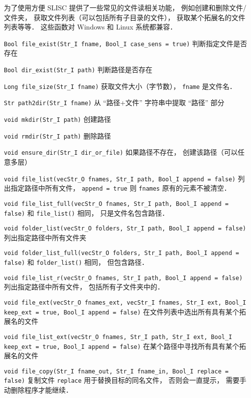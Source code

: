 
\begin{issues}
\issueDraft
\end{issues}

为了使用方便 SLISC 提供了一些常见的文件读相关功能， 例如创建和删除文件/文件夹， 获取文件列表（可以包括所有子目录的文件）， 获取某个拓展名的文件列表等等． 这些函数对 Windows 和 Linux 系统都兼容．

\verb|Bool file_exist(Str_I fname, Bool_I case_sens = true)| 判断指定文件是否存在

\verb|Bool dir_exist(Str_I path)| 判断路径是否存在

\verb|Long file_size(Str_I fname)| 获取文件大小（字节数）， \verb|fname| 是文件名．

\verb|Str path2dir(Str_I fname)| 从 “路径+文件” 字符串中提取 “路径” 部分

\verb|void mkdir(Str_I path)| 创建路径

\verb|void rmdir(Str_I path)| 删除路径

\verb|void ensure_dir(Str_I dir_or_file)| 如果路径不存在， 创建该路径（可以任意多层）

\verb|void file_list(vecStr_O fnames, Str_I path, Bool_I append = false)| 列出指定路径中所有文件， \verb|append = true| 则 \verb|fnames| 原有的元素不被清空．

\verb|void file_list_full(vecStr_O fnames, Str_I path, Bool_I append = false)| 和 \verb|file_list()| 相同， 只是文件名包含路径．

\verb|void folder_list(vecStr_O folders, Str_I path, Bool_I append = false)| 列出指定路径中所有文件夹

\verb|void folder_list_full(vecStr_O folders, Str_I path, Bool_I append = false)| 和 \verb|folder_list()| 相同， 但包含路径．

\verb|void file_list_r(vecStr_O fnames, Str_I path, Bool_I append = false)| 列出指定路径中所有文件， 包括所有子文件夹中的．

\verb|void file_ext(vecStr_O fnames_ext, vecStr_I fnames, Str_I ext, Bool_I keep_ext = true, Bool_I append = false)| 在文件列表中选出所有具有某个拓展名的文件

\verb|void file_list_ext(vecStr_O fnames, Str_I path, Str_I ext, Bool_I keep_ext = true, Bool_I append = false)| 在某个路径中寻找所有具有某个拓展名的文件

\verb|void file_copy(Str_I fname_out, Str_I fname_in, Bool_I replace = false)| 复制文件 \verb|replace| 用于替换目标的同名文件， 否则会一直提示， 需要手动删除程序才能继续．


